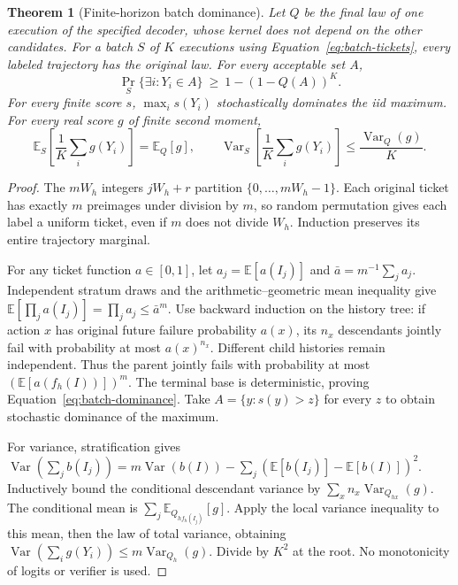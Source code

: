 \documentclass[12pt]{article}
\theoremstyle{readable}
\newtheorem{theorem}{Theorem}
\begin{document}
\begin{theorem}[Finite-horizon batch dominance]
Let $Q$ be the final law of one execution of the specified decoder, whose
kernel does not depend on the other candidates. For a batch $S$ of $K$
executions using Equation~\ref{eq:batch-tickets}, every labeled trajectory
has the original law. For every acceptable set $A$,
\begin{equation}
 \Pr_S\{\exists i:Y_i\in A\}\ \ge\ 1-(1-Q(A))^K.
 \label{eq:batch-dominance}
\end{equation}
For every finite score $s$, $\max_i s(Y_i)$ stochastically dominates the iid
maximum. For every real score $g$ of finite second moment,
\begin{equation}
 \mathbb E_S\left[\frac1K\sum_i g(Y_i)\right]=\mathbb E_Q[g],\qquad
 \operatorname{Var}_S\left[\frac1K\sum_i g(Y_i)\right]
 \le\frac{\operatorname{Var}_Q(g)}{K}.
\end{equation}
\end{theorem}
\begin{proof}
The $mW_h$ integers $jW_h+r$ partition $\{0,\ldots,mW_h-1\}$.
Each original ticket has exactly $m$ preimages under division by $m$, so
random permutation gives each label a uniform ticket, even if $m$ does not
divide $W_h$. Induction preserves its entire trajectory marginal.

For any ticket function $a\in[0,1]$, let $a_j=\mathbb E[a(I_j)]$ and
$\bar a=m^{-1}\sum_j a_j$. Independent stratum draws and the arithmetic--geometric
mean inequality give $\mathbb E[\prod_j a(I_j)]=\prod_j a_j\le\bar a^m$.
Use backward induction on the history tree: if action $x$ has original
future failure probability $a(x)$, its $n_x$ descendants jointly fail with
probability at most $a(x)^{n_x}$. Different child histories remain independent.
Thus the parent jointly fails with probability at most
$(\mathbb E[a(f_h(I))])^m$. The terminal base is deterministic, proving
Equation~\ref{eq:batch-dominance}. Take $A=\{y:s(y)>z\}$ for every $z$ to
obtain stochastic dominance of the maximum.

For variance, stratification gives
$\operatorname{Var}(\sum_j b(I_j))
=m\operatorname{Var}(b(I))-\sum_j(\mathbb E[b(I_j)]-\mathbb E[b(I)])^2$.
Inductively bound the conditional descendant variance by
$\sum_x n_x\operatorname{Var}_{Q_{hx}}(g)$. The conditional mean is
$\sum_j\mathbb E_{Q_{h f_h(I_j)}}[g]$. Apply the local variance inequality
to this mean, then the law of total variance, obtaining
$\operatorname{Var}(\sum_i g(Y_i))\le m\operatorname{Var}_{Q_h}(g)$.
Divide by $K^2$ at the root. No monotonicity of logits or verifier is used.
\end{proof}
\end{document}
